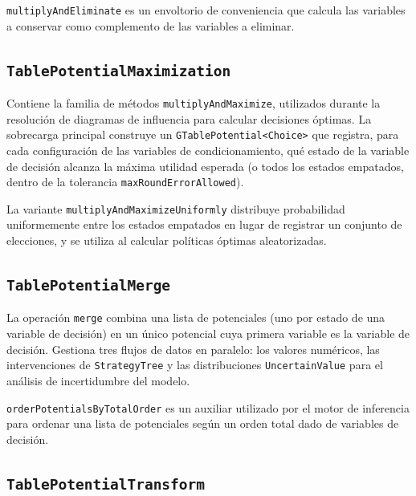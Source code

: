\documentclass[11pt,a4paper]{article}
\newcommand{\code}[1]{\texttt{#1}}
\begin{document}
\code{multiplyAndEliminate} es un envoltorio de conveniencia que calcula las
variables a conservar como complemento de las variables a eliminar.

\subsection{\code{TablePotentialMaximization}}

Contiene la familia de m\'etodos \code{multiplyAndMaximize}, utilizados durante la
resoluci\'on de diagramas de influencia para calcular decisiones \'optimas.  La
sobrecarga principal construye un \code{GTablePotential<Choice>} que registra, para
cada configuraci\'on de las variables de condicionamiento, qu\'e estado de la
variable de decisi\'on alcanza la m\'axima utilidad esperada (o todos los estados
empatados, dentro de la tolerancia \code{maxRoundErrorAllowed}).

La variante \code{multiplyAndMaximizeUniformly} distribuye probabilidad
uniformemente entre los estados empatados en lugar de registrar un conjunto de
elecciones, y se utiliza al calcular pol\'iticas \'optimas aleatorizadas.

\subsection{\code{TablePotentialMerge}}

La operaci\'on \code{merge} combina una lista de potenciales (uno por estado de una
variable de decisi\'on) en un \'unico potencial cuya primera variable es la variable
de decisi\'on.  Gestiona tres flujos de datos en paralelo: los valores num\'ericos,
las intervenciones de \code{StrategyTree} y las distribuciones \code{UncertainValue}
para el an\'alisis de incertidumbre del modelo.

\code{orderPotentialsByTotalOrder} es un auxiliar utilizado por el motor de
inferencia para ordenar una lista de potenciales seg\'un un orden total dado de
variables de decisi\'on.

\subsection{\code{TablePotentialTransform}}
\end{document}
